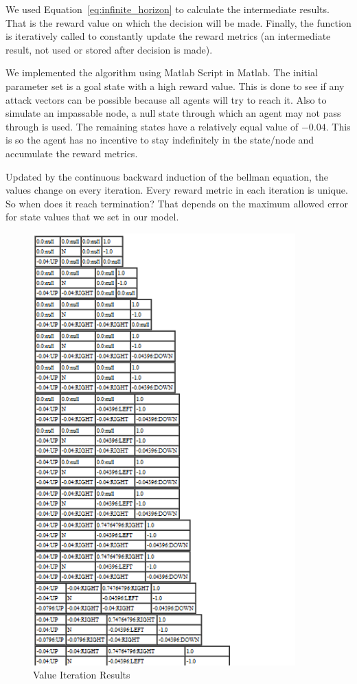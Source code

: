 We used Equation~\ref{eq:infinite_horizon} to calculate the intermediate
results. That is the
reward value on which the decision will be made. Finally, the function is iteratively called to constantly update the reward
metrics (an intermediate result, not used or stored after decision is made).

We implemented the algorithm using Matlab Script in Matlab. The
initial parameter set is a goal state with a high
reward value. This is done to see if any attack vectors can be possible because
all agents will try to reach it. Also to simulate an impassable node, a null
state through which an agent may not pass through is used. The
remaining states have a relatively equal value of \(-0.04\). This is so the agent
has no incentive to stay indefinitely in the state/node and accumulate the
reward metrics.

Updated by the continuous backward induction of the bellman equation,
the values change on every iteration. Every reward metric in
each iteration is unique. So when does it reach termination? That depends on the
maximum allowed error for state values that we set in our model. 
\FloatBarrier 
\begin{figure}[h!]
    \begin{center}
        \includegraphics[width=0.90\textwidth]{Figures/Planning_Figure_2.png}
        \caption{Value Iteration Results}
        \label{fig:ValueIterationResults}
    \end{center}
\end{figure}

